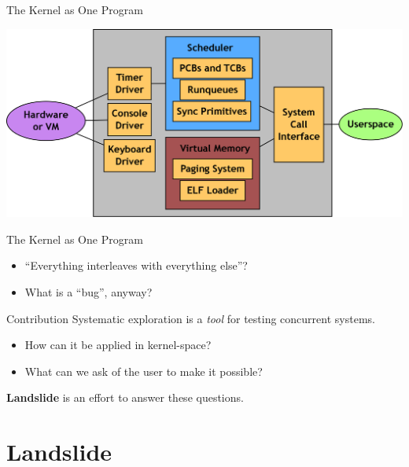 \documentclass[xcolor=dvipsnames]{beamer}
\begin{document}
\begin{frame}{The Kernel as One Program} %
	\begin{center}
	\includegraphics[width=\textwidth]{pebbles.png}
	\end{center}
\end{frame}
\begin{frame}{The Kernel as One Program} %
	\begin{itemize}
		\item ``Everything interleaves with everything else''?
		\item What is a ``bug'', anyway?
	\end{itemize}
\end{frame}

\begin{frame}{Contribution} %
	Systematic exploration is a {\em tool} for testing concurrent systems.
	\begin{itemize}
		\item How can it be applied in kernel-space?
		\item What can we ask of the user to make it possible?
	\end{itemize}
	\linegap

	{\bf Landslide} is an effort to answer these questions.
\end{frame}

\section{Landslide}
\end{document}
